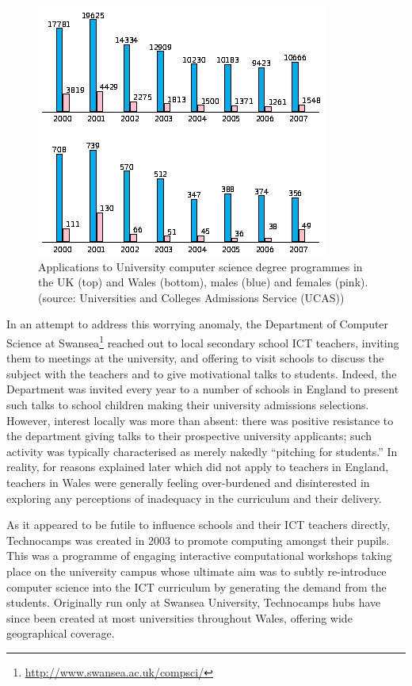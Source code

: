 \documentclass{sig-alternate}
\begin{document}
\begin{figure}[!ht]
  \centering
  \includegraphics[width=0.9\columnwidth]{images/numbers.png}
  \caption{Applications to University computer science degree programmes
           in the UK (top) and Wales (bottom), males (blue) and females (pink).
           (source: Universities and Colleges Admissions Service
           (UCAS))}
  \label{fig:numbers}
\end{figure}

In an attempt to address this worrying anomaly, the Department of
Computer Science at
Swansea\footnote{\url{http://www.swansea.ac.uk/compsci/}} reached out
to local secondary school ICT teachers, inviting them to meetings at
the university, and offering to visit schools to discuss the subject
with the teachers and to give motivational talks to students. Indeed,
the Department was invited every year to a number of schools in
England to present such talks to school children making their
university admissions selections.  However, interest locally was more
than absent: there was positive resistance to the department giving
talks to their prospective university applicants; such activity was
typically characterised as merely nakedly ``pitching for students.''
In reality, for reasons explained later which did not apply to
teachers in England, teachers in Wales were generally feeling
over-burdened and disinterested in exploring any perceptions of
inadequacy in the curriculum and their delivery.

As it appeared to be futile to influence schools and their ICT
teachers directly, Technocamps was created in 2003 to promote
computing amongst their pupils.  This was a programme of engaging
interactive computational workshops taking place on the university
campus whose ultimate aim was to subtly re-introduce computer science
into the ICT curriculum by generating the demand from the students.
Originally run only at Swansea University, Technocamps hubs have since
been created at most universities throughout Wales, offering wide
geographical coverage.
\end{document}
